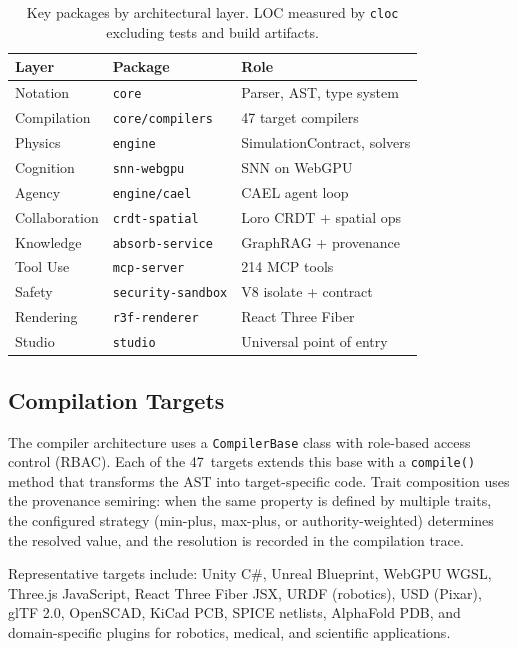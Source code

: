 \documentclass[sigchi-a]{acmart}
\begin{document}
\begin{table}[t]
  \caption{Key packages by architectural layer. LOC measured by
  \texttt{cloc} excluding tests and build artifacts.}
  \label{tab:packages}
  \small
  \begin{tabular}{lll}
    \toprule
    \textbf{Layer} & \textbf{Package} & \textbf{Role} \\
    \midrule
    Notation    & \texttt{core}           & Parser, AST, type system \\
    Compilation & \texttt{core/compilers}  & 47 target compilers \\
    Physics     & \texttt{engine}          & SimulationContract, solvers \\
    Cognition   & \texttt{snn-webgpu}      & SNN on WebGPU \\
    Agency      & \texttt{engine/cael}     & CAEL agent loop \\
    Collaboration & \texttt{crdt-spatial}  & Loro CRDT + spatial ops \\
    Knowledge   & \texttt{absorb-service}  & GraphRAG + provenance \\
    Tool Use    & \texttt{mcp-server}      & 214 MCP tools \\
    Safety      & \texttt{security-sandbox} & V8 isolate + contract \\
    Rendering   & \texttt{r3f-renderer}    & React Three Fiber \\
    Studio      & \texttt{studio}          & Universal point of entry \\
    \bottomrule
  \end{tabular}
\end{table}

\subsection{Compilation Targets}

The compiler architecture uses a \texttt{CompilerBase} class with role-based
access control (RBAC). Each of the 47~targets extends this base with a
\texttt{compile()} method that transforms the AST into target-specific code.
Trait composition uses the provenance semiring: when the same property is
defined by multiple traits, the configured strategy (min-plus, max-plus, or
authority-weighted) determines the resolved value, and the resolution is
recorded in the compilation trace.

Representative targets include: Unity C\#, Unreal Blueprint, WebGPU WGSL,
Three.js JavaScript, React Three Fiber JSX, URDF (robotics), USD (Pixar),
glTF 2.0, OpenSCAD, KiCad PCB, SPICE netlists, AlphaFold PDB, and
domain-specific plugins for robotics, medical, and scientific applications.
\end{document}

